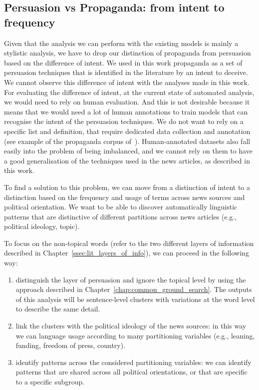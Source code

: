 \subsection{Persuasion vs Propaganda: from intent to frequency}
Given that the analysis we can perform with the existing models is mainly a stylistic analysis, we have to drop our distinction of propaganda from persuasion based on the difference of intent.
We used in this work propaganda as a set of persuasion techniques that is identified in the literature by an intent to deceive.
We cannot observe this difference of intent with the analyses made in this work.
For evaluating the difference of intent, at the current state of automated analysis, we would need to rely on human evaluation.
And this is not desirable because it means that we would need a lot of human annotations to train models that can recognise the intent of the persuasion techniques.
We do not want to rely on a specific list and definition, that require dedicated data collection and annotation (see example of the propaganda corpus of~\citet{da2019fine}).
Human-annotated datasets also fall easily into the problem of being imbalanced, and we cannot rely on them to have a good generalisation of the techniques used in the news articles, as described in this work.

To find a solution to this problem, we can move from a distinction of intent to a distinction based on the frequency and usage of terms across news sources and political orientation.
We want to be able to discover automatically linguistic patterns that are distinctive of different partitions across news articles (e.g., political ideology, topic).

To focus on the non-topical words (refer to the two different layers of information described in Chapter~\ref{ssec:lit_layers_of_info}), we can proceed in the following way:

\begin{enumerate}
    \item distinguish the layer of persuasion and ignore the topical level by using the approach described in Chapter~\ref{chap:common_ground_search}. The outputs of this analysis will be sentence-level clusters with variations at the word level to describe the same detail.
    \item link the clusters with the political ideology of the news sources: in this way we can language usage according to many partitioning variables (e.g., leaning, funding, freedom of press, country).
    \item identify patterns across the considered partitioning variables: we can identify patterns that are shared across all political orientations, or that are specific to a specific subgroup.
\end{enumerate}

